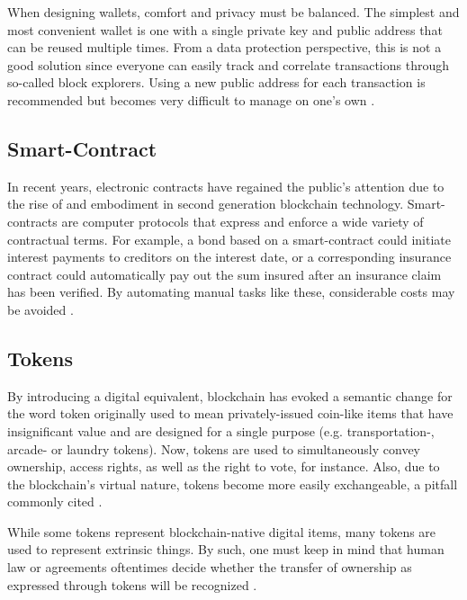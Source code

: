 \documentclass{egpubl}
\begin{document}
When designing wallets, comfort and privacy must be balanced. The simplest and most convenient wallet is one with a single private key and public address that can be reused multiple times. From a data protection perspective, this is not a good solution since everyone can easily track and correlate transactions through so-called block explorers. Using a new public address for each transaction is recommended but becomes very difficult to manage on one's own \cite{10.5555/2695500}.

\subsection{Smart-Contract}
In recent years, electronic contracts have regained the public's attention due to the rise of and embodiment in second generation blockchain technology. Smart-contracts are computer protocols that express and enforce a wide variety of contractual terms. For example, a bond based on a smart-contract could initiate interest payments to creditors on the interest date, or a corresponding insurance contract could automatically pay out the sum insured after an insurance claim has been verified. By automating manual tasks like these, considerable costs may be avoided \cite{smart-contract-definition}. 

\subsection{Tokens}
By introducing a digital equivalent, blockchain has evoked a semantic change for the word token originally used to mean privately-issued coin-like items that have insignificant value and are designed for a single purpose (e.g. transportation-, arcade- or laundry tokens). Now, tokens are used to simultaneously convey ownership, access rights, as well as the right to vote, for instance. Also, due to the blockchain's virtual nature, tokens become more easily exchangeable, a pitfall commonly cited \cite[p. 173]{10.5555/2695500}.

While some tokens represent blockchain-native digital items, many tokens are used to
represent extrinsic things. By such, one must keep in mind that human law or agreements oftentimes decide whether the transfer of ownership as expressed through tokens will be recognized \cite[p. 175-176]{10.5555/2695500}. 
\end{document}
